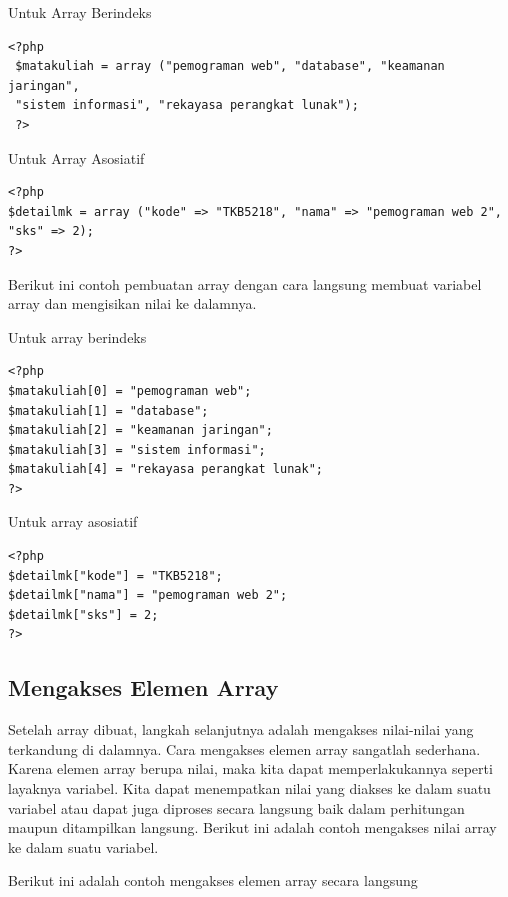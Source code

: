 \item{Untuk Array Berindeks}
\begin{lstlisting}
<?php
 $matakuliah = array ("pemograman web", "database", "keamanan jaringan",
 "sistem informasi", "rekayasa perangkat lunak");
 ?>
\end{lstlisting}

\item{Untuk Array Asosiatif}
\begin{lstlisting}
<?php
$detailmk = array ("kode" => "TKB5218", "nama" => "pemograman web 2", "sks" => 2);
?>
\end{lstlisting}

Berikut ini contoh pembuatan array dengan cara langsung membuat variabel array dan mengisikan nilai ke dalamnya.

\item{Untuk array berindeks}
\begin{lstlisting}
<?php 
$matakuliah[0] = "pemograman web"; 
$matakuliah[1] = "database"; 
$matakuliah[2] = "keamanan jaringan"; 
$matakuliah[3] = "sistem informasi"; 
$matakuliah[4] = "rekayasa perangkat lunak"; 
?>
\end{lstlisting}

\item{Untuk array asosiatif}
\begin{lstlisting}
<?php 
$detailmk["kode"] = "TKB5218"; 
$detailmk["nama"] = "pemograman web 2"; 
$detailmk["sks"] = 2; 
?>
\end{lstlisting}

\subsection{Mengakses Elemen Array}
Setelah array dibuat, langkah selanjutnya adalah mengakses nilai-nilai yang terkandung di dalamnya.
Cara mengakses elemen array sangatlah sederhana. Karena elemen array berupa nilai, maka kita dapat
memperlakukannya seperti layaknya variabel.
Kita dapat menempatkan nilai yang diakses ke dalam suatu variabel atau dapat juga diproses secara
langsung baik dalam perhitungan maupun ditampilkan langsung.
Berikut ini adalah contoh mengakses nilai array ke dalam suatu variabel.


Berikut ini adalah contoh mengakses elemen array secara langsung


